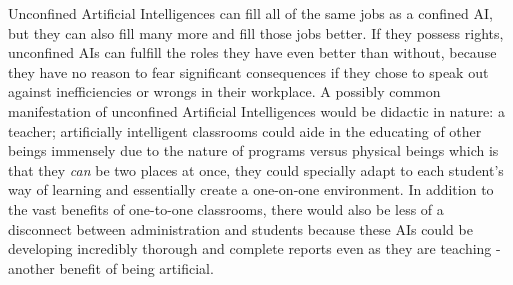 Unconfined Artificial Intelligences can fill all of the same jobs as a confined AI, but they can also fill many more and fill those jobs better. If they possess rights, unconfined AIs can fulfill the roles they have even better than without, because they have no reason to fear significant consequences if they chose to speak out against inefficiencies or wrongs in their workplace. A possibly common manifestation of unconfined Artificial Intelligences would be didactic in nature: a teacher; artificially intelligent classrooms could aide in the educating of other beings immensely due to the nature of programs versus physical beings which is that they \textit{can} be two places at once, they could specially adapt to each student's way of learning and essentially create a one-on-one environment. In addition to the vast benefits of one-to-one classrooms, there would also be less of a disconnect between administration and students because these AIs could be developing incredibly thorough and complete reports even as they are teaching - another benefit of being artificial.